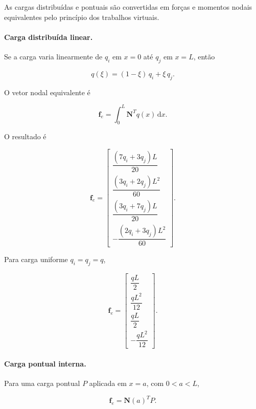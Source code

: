 \documentclass[12pt,a4paper]{article}
\newcommand{\dd}{\mathrm{d}}
\begin{document}
As cargas distribuídas e pontuais são convertidas em forças e momentos nodais equivalentes pelo princípio dos trabalhos virtuais.

\paragraph{Carga distribuída linear.}
Se a carga varia linearmente de \(q_i\) em \(x=0\) até \(q_j\) em \(x=L\), então

\begin{equation}
  q(\xi) = (1-\xi)\,q_i + \xi\,q_j.
  \label{eq:qlinear}
\end{equation}

O vetor nodal equivalente é

\begin{equation}
  \mathbf{f}_e = \int_0^L \mathbf{N}^T q(x)\,\dd x.
  \label{eq:fe_dist}
\end{equation}

O resultado é

\begin{equation}
  \mathbf{f}_e =
  \begin{bmatrix}
    \dfrac{(7q_i+3q_j)L}{20}\\[1.2ex]
    \dfrac{(3q_i+2q_j)L^2}{60}\\[1.2ex]
    \dfrac{(3q_i+7q_j)L}{20}\\[1.2ex]
    -\dfrac{(2q_i+3q_j)L^2}{60}
  \end{bmatrix}.
  \label{eq:fe_dist_result}
\end{equation}

Para carga uniforme \(q_i=q_j=q\),

\begin{equation}
  \mathbf{f}_e =
  \begin{bmatrix}
    \dfrac{qL}{2}\\[1ex]
    \dfrac{qL^2}{12}\\[1ex]
    \dfrac{qL}{2}\\[1ex]
    -\dfrac{qL^2}{12}
  \end{bmatrix}.
  \label{eq:fe_udl}
\end{equation}

\paragraph{Carga pontual interna.}
Para uma carga pontual \(P\) aplicada em \(x=a\), com \(0<a<L\),

\begin{equation}
  \mathbf{f}_e = \mathbf{N}(a)^T P.
  \label{eq:fe_point}
\end{equation}
\end{document}
